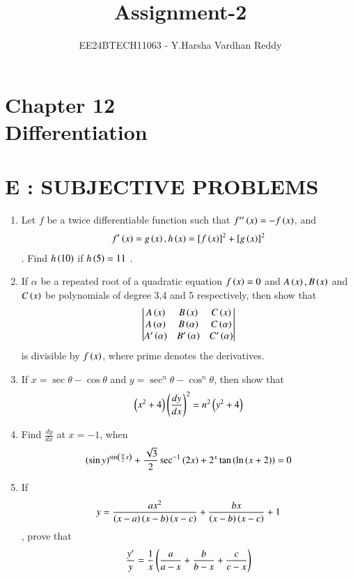 \documentclass[journal,,12pt,twocolumn]{IEEEtran}
\theoremstyle{remark}
\begin{document}
    
    
    
   \title{Assignment-2}
\author{EE24BTECH11063 - Y.Harsha Vardhan Reddy}
\maketitle
\newpage
\bigskip

\renewcommand{\thefigure}{\theenumi}
\renewcommand{\thetable}{\theenumi}
\section*{Chapter 12\\Differentiation}



\section*{E : SUBJECTIVE PROBLEMS}
\begin{enumerate}
\item Let $f$ be a twice differentiable function such that 
$f''\left(x\right)=-f\left(x\right)$, and \begin{align}f'\left(x\right)=g\left(x\right) , h\left(x\right)=[f\left(x\right)]^2+[g\left(x\right)]^2\end{align}. Find $h\left(10\right)$ if $h\left(5\right)=11$ .
\hfill{}
\item If $\alpha$ be a repeated root of a quadratic equation $f\left(x\right)=0$ and $A\left(x\right),B\left(x\right)$ and $C\left(x\right)$ be polynomials of degree 3,4 and 5 respectively, then show that \begin{align}\begin{vmatrix}
A\left(x\right) & B\left(x\right) & C\left(x\right) \\
A\left(\alpha\right) & B\left(\alpha\right) & C\left(\alpha\right) \\
A'\left(\alpha\right) & B'\left(\alpha\right) & C'\left(\alpha\right) 
\end{vmatrix} \end{align}
is divisible by $f\left(x\right)$, where prime denotes the derivatives.
\hfill{}
\item If $x=\sec{\theta}-\cos{\theta}$ and $y=\sec^n{\theta}-\cos^n{\theta}$, then show that \begin{align} \left(x^2 + 4\right) \left(\frac{dy}{dx}\right)^2=n^2 \left(y^2+4\right) \end{align}
\hfill{}
\item Find $\frac{dy}{dx}$ at $x=-1$, when \begin{align}\left(\sin{y}\right)^{\sin\left(\frac{\pi}{2}x\right)} + \frac{\sqrt{3}}{2}\sec^{-1}{(2x)} + 2^x\tan{\ensuremath{\left(\ln{\ensuremath{\left(x+2\right)}}\right)}} = 0 \end{align}
\hfill{}
\item If \begin{align}y = \frac{ax^2}{\left(x-a\right)\left(x-b\right)\left(x-c\right)}+\frac{bx}{\left(x-b\right)\left(x-c\right)}+1\end{align}, prove that \begin{align}\frac{y'}{y}=\frac{1}{x}\left(\frac{a}{a-x}+\frac{b}{b-x}+\frac{c}{c-x}\right)\end{align}
\hfill{}
\end{enumerate}
\end{document}
